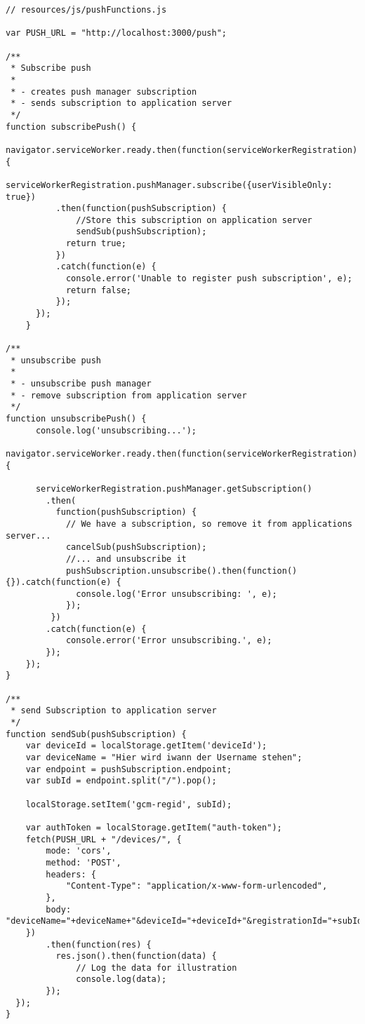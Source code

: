 \begin{lstlisting}[caption={PushFunctions.js - Verarbeitung der PushSubscriptions}, frame=single]
// resources/js/pushFunctions.js

var PUSH_URL = "http://localhost:3000/push";

/**
 * Subscribe push
 *
 * - creates push manager subscription
 * - sends subscription to application server
 */
function subscribePush() {
	  navigator.serviceWorker.ready.then(function(serviceWorkerRegistration) {
	    serviceWorkerRegistration.pushManager.subscribe({userVisibleOnly: true})
	      .then(function(pushSubscription) {
	          //Store this subscription on application server
              sendSub(pushSubscription);
            return true;
	      })
	      .catch(function(e) {
	        console.error('Unable to register push subscription', e);
	        return false;
	      });
	  });
	}

/**
 * unsubscribe push
 *
 * - unsubscribe push manager
 * - remove subscription from application server
 */
function unsubscribePush() {
	  console.log('unsubscribing...');
	  navigator.serviceWorker.ready.then(function(serviceWorkerRegistration) {

	  serviceWorkerRegistration.pushManager.getSubscription()
		.then(
		  function(pushSubscription) {
			// We have a subscription, so remove it from applications server...
			cancelSub(pushSubscription);
			//... and unsubscribe it
			pushSubscription.unsubscribe().then(function() {}).catch(function(e) {
			  console.log('Error unsubscribing: ', e);
			});
	     })
		.catch(function(e) {
	      	console.error('Error unsubscribing.', e);
	   	});
	});  
}

/**
 * send Subscription to application server
 */
function sendSub(pushSubscription) {
	var deviceId = localStorage.getItem('deviceId');
	var deviceName = "Hier wird iwann der Username stehen";
    var endpoint = pushSubscription.endpoint;
    var subId = endpoint.split("/").pop();

    localStorage.setItem('gcm-regid', subId);

    var authToken = localStorage.getItem("auth-token");
    fetch(PUSH_URL + "/devices/", {
        mode: 'cors',
        method: 'POST',
        headers: {
            "Content-Type": "application/x-www-form-urlencoded",
	    },
        body: "deviceName="+deviceName+"&deviceId="+deviceId+"&registrationId="+subId+"&endpoint="+endpoint+"&token="+authToken,
    })
		.then(function(res) {
		  res.json().then(function(data) {
              // Log the data for illustration
              console.log(data);
        });
  });
}
\end{lstlisting}
